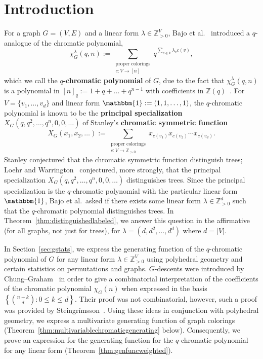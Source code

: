 \documentclass[11pt]{amsart}
\newcommand\Def[1]{{\bf #1}}
\begin{document}
\maketitle



\section{Introduction}

For a graph $G=(V,E)$ and a linear form $\lambda \in \mathbb{Z}_{ >0 }^V$, Bajo et al.~\cite{qchromatic}
introduced a $q$-analogue of the chromatic polynomial,
\[
    \chi_G^\lambda(q,n) := \sum_{\substack{\text{proper colorings} \\ c:V \to [n]}} q^{\sum_{v \in V} \lambda_v c(v)},
\]
which we call the \Def{$q$-chromatic polynomial} of $G$, due to the fact that $\chi_G^\lambda(q,n)$ is a polynomial
in $[n]_q := 1 + q + \dots + q^{ n-1 } $ with coefficients in $\mathbb{Z}(q)$~\cite{qchromatic}.
For $V=\{v_1,\ldots,v_d\}$ and linear form $\mathbbm{1} := (1, 1, \dots, 1)$, the $q$-chromatic polynomial is known
to be the \Def{principal specialization} $X_G(q,q^2,\hdots,q^n,0,0,\hdots)$ of Stanley's \Def{chromatic symmetric function}~\cite{stanleychromatic} 
\[
    X_G(x_1,x_2,\ldots) := \sum_{\substack{\text{proper colorings} \\ c:V \to \mathbb{Z}_{>0}}} x_{c(v_1)} x_{c(v_2)} \cdots x_{c(v_d)}.
\]
Stanley conjectured that the chromatic symmetric function distinguish trees; Loehr and
Warrington~\cite{loehrwarrington} conjectured, more strongly, that the principal specialization $X_G(q,q^2,\hdots,q^n,0,0,\hdots)$ distinguishes trees. 
Since the principal specialization is the $q$-chromatic polynomial with the particular linear form
$\mathbbm{1}$, Bajo et al.\ asked if there exists some linear form $\lambda \in \mathbb{Z}_{>0}^d$ such
that the $q$-chromatic polynomial distinguishes trees. In Theorem~\ref{thm:distinguishedlabeled}, we answer this question in the affirmative (for all graphs, not
just for trees), for
$\lambda = (d, d^2, \ldots, d^d)$ where $d = |V|$.

In Section~\ref{sec:gstats}, we express the generating function of the $q$-chromatic
polynomial of $G$ for any linear form $\lambda \in \mathbb{Z}_{ >0 }^V$ using polyhedral geometry and certain statistics on permutations and graphs. %
$G$-descents were introduced by Chung--Graham~\cite{chunggrahamcoverpol} in order to give a combinatorial
interpretation of the coefficients of the chromatic polynomial $\chi_G(n)$ when expressed in the basis
$\left\{\binom{n+k}{d} : 0 \leq k \leq d\right\}$.
Their proof was not combinatorial, however, such a proof was provided by Steingrímsson~\cite{steingrimssoncoloring}.
Using these ideas in conjunction with polyhedral geometry, we express a multivariate generating function of
graph colorings (Theorem~\ref{thm:multivariablechromaticgenerating} below). 
Consequently, we prove an expression for the generating function for the $q$-chromatic polynomial for any
linear form (Theorem~\ref{thm:genfuncweighted}).
\end{document}
